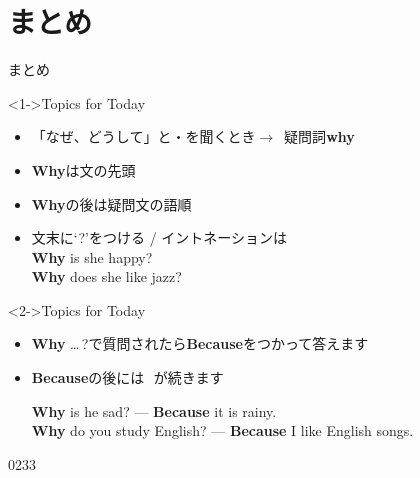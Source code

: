 \documentclass[aspectratio=169,xcolor={dvipsnames,table}]{beamer}
\begin{document}
\section{まとめ}
\begin{frame}[plain]{まとめ}
 
\begin{block}<1->{Topics for Today}
\begin{itemize}[square]\small
 \item \<「なぜ、どうして」と・を聞くとき$\longrightarrow$\,\,\,疑問詞{\bfseries why} 
 \item {\bfseries Why}は文の先頭
 \item {\bfseries Why}の後は疑問文の語順
 \item   文末に`?'をつける / イントネーションは\myDownwardPitch{}\\
\hfill{}{\scriptsize {\bfseries Why} is she happy?}\\
\hfill{}{\scriptsize {\bfseries Why} does she like jazz?}
\end{itemize}
     \end{block}


\begin{block}<2->{Topics for Today}
\begin{itemize}[square]\small
 \item {\bfseries Why} \ldots\,?で質問されたら{\bfseries Because}をつかって答えます\hfill{\scriptsize {}}
 \item {\bfseries Because}の後には\,\,\,\,が続きます

\hfill{}{\scriptsize {\bfseries Why} is he sad? --- {\bfseries Because} it is rainy.}\\
\hfill{}{\scriptsize {\bfseries Why} do you study English? --- {\bfseries Because} I like English songs.}
\end{itemize}
     \end{block}
\hfill{\tiny 0233}\,{\scriptsize {}}
\end{frame}
\end{document}
